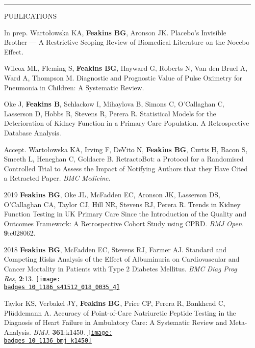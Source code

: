 \documentclass[10pt,a4paper]{article}
\def\badges{./badges/}
\begin{document}
\noindent\rule{\textwidth}{0.4pt}
\begin{cvlist}{PUBLICATIONS}
  
  \item[In prep.]
  Warto\l{}owska KA, \textbf{Feakins BG}, Aronson JK. Placebo’s Invisible Brother --- A Restrictive Scoping Review of Biomedical Literature on the Nocebo Effect.
  
  \item[]
  Wilcox ML, Fleming S, \textbf{Feakins BG}, Hayward G, Roberts N, Van den Bruel A, Ward A, Thompson M. Diagnostic and Prognostic Value of Pulse Oximetry for Pneumonia in Children: A Systematic Review.
  
  \item[]
  Oke J, \textbf{Feakins B}, Schlackow I, Mihaylova B, Simons C, O'Callaghan C, Lasserson D, Hobbs R, Stevens R, Perera R. Statistical Models for the Deterioration of Kidney Function in a Primary Care Population. A Retrospective Database Analysis.
  
  \item[Accept.]
  Warto\l{}owska KA, Irving F, DeVito N, \textbf{Feakins BG}, Curtis H, Bacon S, Smeeth L, Heneghan C, Goldacre B. RetractoBot: a Protocol for a Randomised Controlled Trial to Assess the Impact of Notifying Authors that they Have Cited a Retracted Paper. \textit{BMC Medicine}. 
  
  \item[2019]
  \textbf{Feakins BG}, Oke JL, McFadden EC, Aronson JK, Lasserson DS, O'Callaghan CA, Taylor CJ, Hill NR, Stevens RJ, Perera R. Trends in Kidney Function Testing in UK Primary Care Since the Introduction of the Quality and Outcomes Framework: A Retrospective Cohort Study using CPRD. \textit{BMJ Open}. \textbf{9}:e028062. 
  
  \item[2018]
  \textbf{Feakins BG}, McFadden EC, Stevens RJ, Farmer AJ. Standard and Competing Risks Analysis of the Effect of Albuminuria on Cardiovascular and Cancer Mortality in Patients with Type 2 Diabetes Mellitus. \textit{BMC Diag Prog Res}, \textbf{2}:13.  \href{https://biomedcentral.altmetric.com/details/45475518}{\texttt{[image: \\badges 10\_1186\_s41512\_018\_0035\_4]}}
  
  \item[]
  Taylor KS, Verbakel JY, \textbf{Feakins BG}, Price CP, Perera R, Bankhead C, Pl\"uddemann A. Accuracy of Point-of-Care Natriuretic Peptide Testing in the Diagnosis of Heart Failure in Ambulatory Care: A Systematic Review and Meta-Analysis. \textit{BMJ}. \textbf{361}:k1450.  \href{https://bmj.altmetric.com/details/42193657}{\texttt{[image: \\badges 10\_1136\_bmj\_k1450]}}
  

\end{cvlist}
\end{document}
